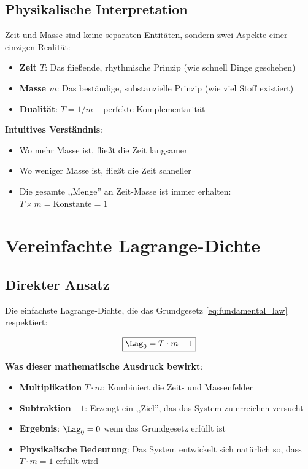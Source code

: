 	\subsection{Physikalische Interpretation}
	
	\begin{definition}
		Zeit und Masse sind keine separaten Entitäten, sondern zwei Aspekte einer einzigen Realität:
		\begin{itemize}
			\item \textbf{Zeit $T$}: Das fließende, rhythmische Prinzip (wie schnell Dinge geschehen)
			\item \textbf{Masse $m$}: Das beständige, substanzielle Prinzip (wie viel Stoff existiert)
			\item \textbf{Dualität}: $T = 1/m$ -- perfekte Komplementarität
		\end{itemize}
	\end{definition}
	
	\textbf{Intuitives Verständnis}: 
	\begin{itemize}
		\item Wo mehr Masse ist, fließt die Zeit langsamer
		\item Wo weniger Masse ist, fließt die Zeit schneller  
		\item Die gesamte ,,Menge'' an Zeit-Masse ist immer erhalten: $T \times m = \text{Konstante} = 1$
	\end{itemize}
	
	\section{Vereinfachte Lagrange-Dichte}
	
	\subsection{Direkter Ansatz}
	
	Die einfachste Lagrange-Dichte, die das Grundgesetz \eqref{eq:fundamental_law} respektiert:
	
	\begin{equation}
		\boxed{\Lag_0 = T \cdot m - 1}
		\label{eq:simple_lagrangian}
	\end{equation}
	
	\textbf{Was dieser mathematische Ausdruck bewirkt}:
	\begin{itemize}
		\item \textbf{Multiplikation} $T \cdot m$: Kombiniert die Zeit- und Massenfelder
		\item \textbf{Subtraktion} $-1$: Erzeugt ein ,,Ziel'', das das System zu erreichen versucht
		\item \textbf{Ergebnis}: $\Lag_0 = 0$ wenn das Grundgesetz erfüllt ist
		\item \textbf{Physikalische Bedeutung}: Das System entwickelt sich natürlich so, dass $T \cdot m = 1$ erfüllt wird
	\end{itemize}
	
